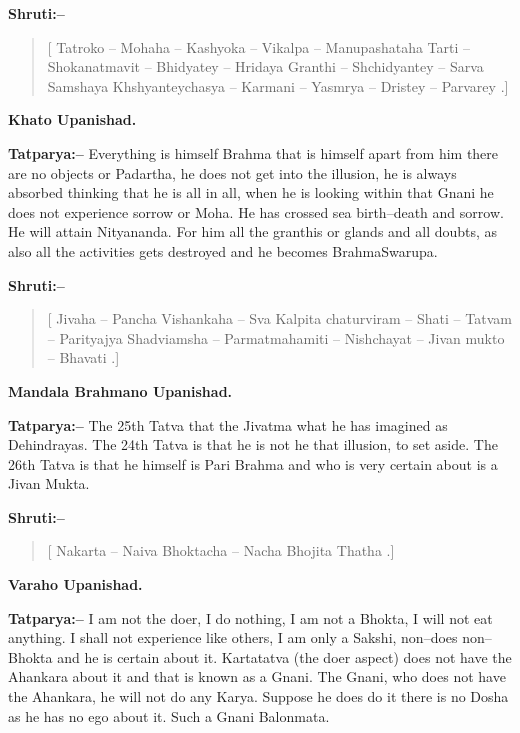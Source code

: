 \textbf{Shruti:–}

\begin{verse}
[ Tatroko – Mohaha – Kashyoka – Vikalpa – Manupashataha  Tarti – Shokanatmavit – Bhidyatey – Hridaya Granthi – Shchidyantey – Sarva Samshaya  Khshyanteychasya – Karmani – Yasmrya – Dristey – Parvarey .]
\end{verse}

\begin{flushright}
\textbf{Khato Upanishad.}
\end{flushright}

\textbf{Tatparya:–} Everything is himself Brahma that is himself apart from him there are no objects or Padartha, he does not get into the illusion, he is always absorbed thinking that he is all in all, when he is looking within that Gnani he does not experience sorrow or Moha. He has crossed sea birth–death and sorrow. He will attain Nityananda. For him all the granthis or glands and all doubts, as also all the activities gets destroyed and he becomes BrahmaSwarupa.

\textbf{Shruti:–}

\begin{verse}
[ Jivaha – Pancha Vishankaha – Sva Kalpita chaturviram – Shati – Tatvam – Parityajya  Shadviamsha – Parmatmahamiti – Nishchayat – Jivan mukto – Bhavati .]
\end{verse}

\begin{flushright}
\textbf{Mandala Brahmano Upanishad.}
\end{flushright}

\textbf{Tatparya:–} The 25th Tatva that the Jivatma what he has imagined as Dehindrayas. The 24th Tatva is that he is not he that illusion, to set aside. The 26th Tatva is that he himself is Pari Brahma and who is very certain about is a Jivan Mukta.

\textbf{Shruti:–}

\begin{verse}
[ Nakarta – Naiva Bhoktacha – Nacha Bhojita Thatha .]
\end{verse}

\begin{flushright}
\textbf{Varaho Upanishad.}
\end{flushright}

\textbf{Tatparya:–} I am not the doer, I do nothing, I am not a Bhokta, I will not eat anything. I shall not experience like others, I am only a Sakshi, non–does non–Bhokta and he is certain about it. Kartatatva (the doer aspect) does not have the Ahankara about it and that is known as a Gnani. The Gnani, who does not have the Ahankara, he will not do any Karya. Suppose he does do it there is no Dosha as he has no ego about it. Such a Gnani Balonmata.

